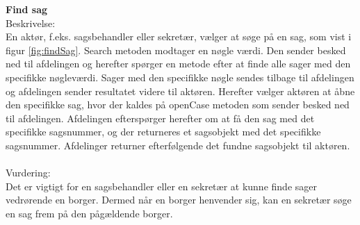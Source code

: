 \textbf{Find sag}\\
Beskrivelse: \\
En aktør, f.eks. sagsbehandler eller sekretær, vælger at søge på en sag, som vist i figur \ref{fig:findSag}. Search metoden modtager en nøgle værdi. Den sender besked ned til afdelingen og herefter spørger en metode efter at finde alle sager med den specifikke nøgleværdi. Sager med den specifikke nøgle sendes tilbage til afdelingen og afdelingen sender resultatet videre til aktøren. Herefter vælger aktøren at åbne den specifikke sag, hvor der kaldes på openCase metoden som sender besked ned til afdelingen. Afdelingen efterspørger herefter om at få den sag med det specifikke sagsnummer, og der returneres et sagsobjekt med det specifikke sagsnummer. Afdelinger returner efterfølgende det fundne sagsobjekt til aktøren. \\ \\
Vurdering:\\
Det er vigtigt for en sagsbehandler eller en sekretær at kunne finde sager vedrørende en borger. Dermed når en borger henvender sig, kan en sekretær søge en sag frem på den pågældende borger.  
